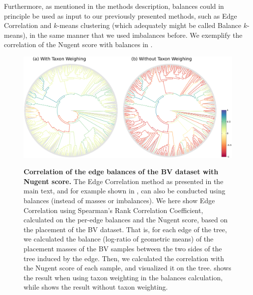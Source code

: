 Furthermore, as mentioned in the methods description,
balances could in principle be used as input to our previously presented methods,
such as Edge Correlation and $k$-means clustering (which adequately might be called Balance $k$-means),
in the same manner that we used imbalances before.
We exemplify the correlation of the Nugent score with balances in .

\begin{figure}[!htb]
    \centering
    \includegraphics[width=\linewidth]{pdf/bv_place_edge_balances_correlation.pdf}
    \begin{subfigure}{0pt}
        \label{fig:bv_place_edge_balances_correlation:sub:with_taxon_weighting}
    \end{subfigure}
    \begin{subfigure}{0pt}
        \label{fig:bv_place_edge_balances_correlation:sub:without_taxon_weighting}
    \end{subfigure}
    \caption{
        \textbf{Correlation of the edge balances of the \ac{BV} dataset with Nugent score.}
        The Edge Correlation method as presented in the main text,
        and for example shown in ,
        can also be conducted using balances (instead of masses or imbalances).
        We here show Edge Correlation using Spearman's Rank Correlation Coefficient,
        calculated on the per-edge balances and the Nugent score, based on the placement of the \ac{BV} dataset.
        That is, for each edge of the tree, we calculated the balance (log-ratio of geometric means)
        of the placement masses of the \ac{BV} samples between the two sides of the tree induced by the edge.
        Then, we calculated the correlation with the Nugent score of each sample, and visualized it on the tree.
         shows the result when
        using taxon weighting \cite{Silverman2017} in the balances calculation,
        while  shows the result
        without taxon weighting.
    }
    \label{fig:bv_place_edge_balances_correlation}
\end{figure}

